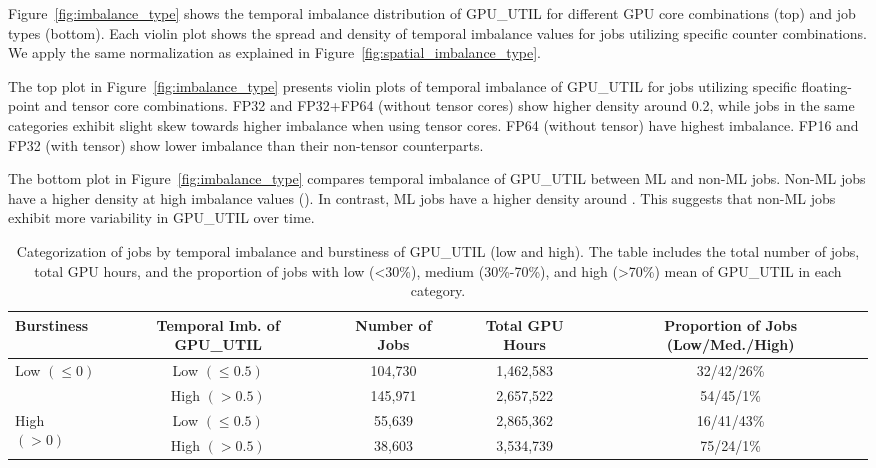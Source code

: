 Figure~\ref{fig:imbalance_type} shows the temporal imbalance distribution of
GPU\_UTIL for different GPU core combinations (top) and job types (bottom).
Each violin plot shows the spread and density of temporal imbalance values for
jobs utilizing specific counter combinations. We apply the same
normalization as explained in Figure~\ref{fig:spatial_imbalance_type}.

The top plot in Figure~\ref{fig:imbalance_type} presents violin plots of
temporal imbalance of GPU\_UTIL for jobs utilizing specific floating-point
and tensor core combinations. FP32 and FP32+FP64 (without tensor cores)
show higher density around 0.2, while jobs in the same categories
exhibit slight skew towards higher imbalance when using tensor cores.
FP64 (without tensor) have highest imbalance. FP16 and
FP32 (with tensor) show lower imbalance than their non-tensor
counterparts.

The bottom plot in Figure~\ref{fig:imbalance_type} compares temporal imbalance
of GPU\_UTIL between ML and non-ML jobs. Non-ML jobs have a higher density at
high imbalance values (). In contrast, ML jobs have a higher
density around . This suggests that non-ML jobs exhibit more
variability in GPU\_UTIL over time.

\begin{table*}[t]
    \centering
    \caption{Categorization of jobs by temporal imbalance and burstiness of
        GPU\_UTIL (low and high). The table includes the
        total number of jobs, total GPU hours, and the proportion of jobs
        with low (\textless30\%), medium (30\%-70\%), and high (\textgreater70\%) mean
        of GPU\_UTIL in each category.}
    \label{tab:burst-imbalance}
    \begin{tabular}{l|c|c|c|c}
        \hline
        \textbf{Burstiness}             & \textbf{Temporal Imb. of GPU\_UTIL} & \textbf{Number of Jobs} & \textbf{Total GPU Hours} & \textbf{Proportion of Jobs (Low/Med./High)} \\
        \hline
        \multirow{2}{*}{Low $(\leq 0)$} & Low $(\leq 0.5)$                    & 104,730                 & 1,462,583                & 32/42/26\%                                  \\
                                        & High $(> 0.5)$                      & 145,971                 & 2,657,522                & 54/45/1\%                                   \\
        \hline
        \multirow{2}{*}{High $(> 0)$}   & Low $(\leq 0.5)$                    & 55,639                  & 2,865,362                & 16/41/43\%                                  \\
                                        & High $(> 0.5)$                      & 38,603                  & 3,534,739                & 75/24/1\%                                   \\
        \hline
    \end{tabular}
\end{table*}

